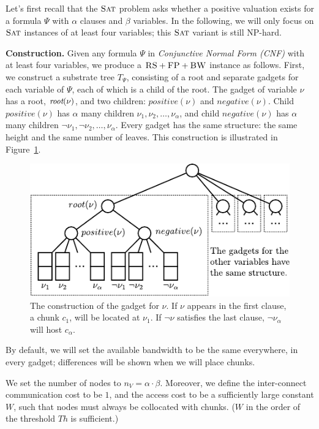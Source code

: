 \documentclass[9pt]{sigcomm-alternate}
\newcommand{\variab}{\nu}
\newcommand{\aroot}{\emph{root}}
\newcommand{\clauses}{\alpha}
\newcommand{\variables}{\beta}
\newcommand{\achunk}{\ensuremath{c}}
\newcommand{\FP}{\textsc{FP}}
\newcommand{\RS}{\textsc{RS}}
\newcommand{\BW}{\textsc{BW}}
\newcommand{\Tree}{\ensuremath{T}}
\newcommand{\Vms}{\ensuremath{n_V}}
\newcommand{\SAT}{\textsc{Sat}}
\newcommand{\Formula}{\ensuremath{\Psi}}
\newcommand{\Thr}{\ensuremath{Th}}
\newcommand{\positive}{\ensuremath{positive}}
\newcommand{\negative}{\ensuremath{negative}}
\begin{document}
\begin{appendix}
Let's first recall that the $\SAT$ problem asks whether a positive valuation exists
for a formula $\Formula$ with $\clauses$ clauses and $\variables$ variables.
In the following, we will only focus on $\SAT$ instances of at least four variables;
this $\SAT$ variant is still NP-hard.

\textbf{Construction.}
Given any formula $\Formula$ in \emph{Conjunctive Normal Form (CNF)} with at least four variables, we produce
a $\RS+\FP+\BW$ instance as follows. First, we construct a substrate tree $\Tree_{\Formula}$, consisting of
a root and separate gadgets for each variable of $\Formula$, each of which
is a child of the root.
The gadget of variable $\variab$ has a root, $\aroot(\variab)$, and two children:
$\positive(\variab)$ and $\negative(\variab)$. Child $\positive(\variab)$ has $\clauses$
many children $\nu_1, \nu_2, \ldots, \nu_{\clauses}$, and child
$\negative(\variab)$ has
$\clauses$ many children $\neg \nu_1, \neg \nu_2, \dots, \nu_{\clauses}$. Every
gadget has the same structure: the same height and the same number of
leaves. This construction is illustrated in
Figure~\ref{fig:construction_3sat}.


\begin{figure}
\includegraphics[width=\columnwidth]{figs/construction_3sat}
\caption{The construction of the gadget for $\nu$. If $\nu$ appears in the
first clause, a chunk $\achunk_1$, will be located at $\nu_1$. If $\neg \nu$
satisfies the last clause, $\neg
\nu_\alpha$ will host $\achunk_\alpha$.}
\label{fig:construction_3sat}
\end{figure}


By default, we will set the available
bandwidth to be the
same everywhere, in every gadget; differences will be shown when we
will place chunks.

We set the number of nodes to $\Vms = \clauses \cdot \variables$.
Moreover, we define the inter-connect communication cost to be $1$,
and the access cost to be a sufficiently large constant $W$,
such that nodes must always be collocated with chunks. ($W$ in the order of
the threshold $\Thr$ is sufficient.)


\end{appendix}
\end{document}
